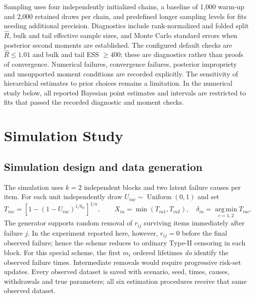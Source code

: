 \documentclass[a4paper,11pt]{article}
\begin{document}
Sampling uses four independently initialized chains, a baseline of 1,000 warm-up and 2,000 retained draws per chain, and predefined longer sampling levels for fits needing additional precision. Diagnostics include rank-normalized and folded split $\widehat R$, bulk and tail effective sample sizes, and Monte Carlo standard errors when posterior second moments are established. The configured default checks are $\widehat R\le1.01$ and bulk and tail ESS $\ge400$; these are diagnostics rather than proofs of convergence. Numerical failures, convergence failures, posterior impropriety and unsupported moment conditions are recorded explicitly. The sensitivity of hierarchical estimates to prior choices remains a limitation. In the numerical study below, all reported Bayesian point estimates and intervals are restricted to fits that passed the recorded diagnostic and moment checks.

\section{Simulation Study}\label{sec:simulation}
\subsection{Simulation design and data generation}
The simulation uses $k=2$ independent blocks and two latent failure causes per item. For each unit independently draw $U_{iuc}\sim\operatorname{Uniform}(0,1)$ and set
\begin{equation}\label{eq:sim-inverse}
T_{iuc}=\left[1-(1-U_{iuc})^{1/b_{ic}}\right]^{1/a},\qquad
X_{iu}=\min(T_{iu1},T_{iu2}),\quad
\delta_{iu}=\operatorname*{arg\,min}_{c=1,2}T_{iuc}.
\end{equation}
The generator supports random removal of $r_{ij}$ surviving items immediately after failure $j$. In the experiment reported here, however, $r_{ij}=0$ before the final observed failure; hence the scheme reduces to ordinary Type-II censoring in each block. For this special scheme, the first $m_i$ ordered lifetimes \emph{do} identify the observed failure times. Intermediate removals would require progressive risk-set updates. Every observed dataset is saved with scenario, seed, times, causes, withdrawals and true parameters; all six estimation procedures receive that same observed dataset.
\end{document}

